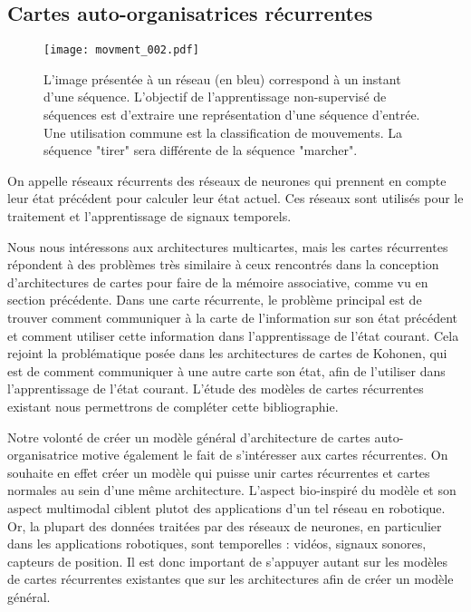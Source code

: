 \documentclass[../main]{subfiles}
\begin{document}
\subsection{Cartes auto-organisatrices récurrentes}

\begin{figure}
   \centering\texttt{[image: movment\_002.pdf]}
   \caption{L'image présentée à un réseau (en bleu) correspond à un instant d'une séquence. L'objectif de l'apprentissage non-supervisé de séquences est d'extraire une représentation d'une séquence d'entrée. Une utilisation commune est la classification de mouvements. La séquence "tirer" sera différente de la séquence "marcher".\label{fig:mouvement}}
\end{figure}

On appelle réseaux récurrents des réseaux de neurones qui prennent en compte leur état précédent pour calculer leur état actuel. Ces réseaux sont utilisés pour le traitement et l'apprentissage de signaux temporels. 

Nous nous intéressons aux architectures multicartes, mais les cartes récurrentes répondent à des problèmes très similaire à ceux rencontrés dans la conception d'architectures de cartes pour faire de la mémoire associative, comme vu en section précédente.
Dans une carte récurrente, le problème principal est de trouver comment communiquer à la carte de l'information sur son état précédent et comment utiliser cette information dans l'apprentissage de l'état courant. Cela rejoint la problématique posée dans les architectures de cartes de Kohonen, qui est de comment communiquer à une autre carte son état, afin de l'utiliser dans l'apprentissage de l'état courant. L'étude des modèles de cartes récurrentes existant nous permettrons de compléter cette bibliographie. 

Notre volonté de créer un modèle général d'architecture de cartes auto-organisatrice motive également le fait de s'intéresser aux cartes récurrentes. On souhaite en effet créer un modèle qui puisse unir cartes récurrentes et cartes normales au sein d'une même architecture. L'aspect bio-inspiré du modèle et son aspect multimodal ciblent plutot des applications d'un tel réseau en robotique. Or, la plupart des données traitées par des réseaux de neurones, en particulier dans les applications robotiques, sont temporelles : vidéos, signaux sonores, capteurs de position. Il est donc important de s'appuyer autant sur les modèles de cartes récurrentes existantes que sur les architectures afin de créer un modèle général.
\end{document}
